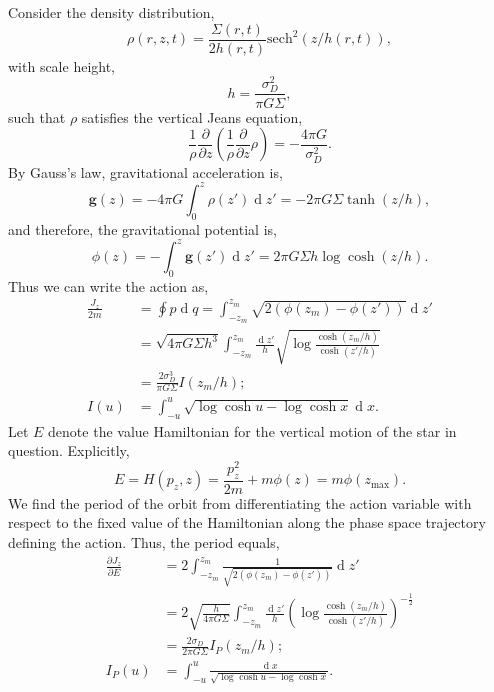 \documentclass[usenatbib]{mnras}
\renewcommand{\d}[1]{\! \mathrm{d}#1 \:}
\newcommand{\pderiv}[2]{\frac{\partial{#1}}{\partial{#2}}}
\newcommand{\sech}{\mathrm{sech}}
\renewcommand{\d}[1]{\ensuremath{\operatorname{d}\!{#1}}}
\begin{document}
Consider the density distribution,
\begin{equation} 
\rho(r, z, t) = \frac{\Sigma(r,t)}{2 h(r, t)} \sech^2{(z/h(r,t))}, 
\end{equation}
with scale height,
\begin{equation}
h = \frac{\sigma_D^2}{\pi G \Sigma},
\end{equation}
such that $\rho$ satisfies the vertical Jeans equation,
\begin{equation}
\frac{1}{\rho} \pderiv{}{z} \left( \frac{1}{\rho} \pderiv{}{z} \rho \right) = - \frac{4 \pi G}{\sigma_D^2}.
\end{equation}
By Gauss's law,  gravitational acceleration is,
\begin{equation}
\mathbf{g}(z) = -4 \pi G \int_0^z \rho(z') \d{z'} = -2 \pi G \Sigma \tanh{(z / h)}, 
\end{equation}
and therefore, the gravitational potential is,
\begin{equation}
\phi(z) = - \int_0^z \mathbf{g}(z') \d{z'} = 2 \pi G \Sigma h \log{\cosh{(z / h)}}.
\end{equation}
Thus we can write the action as,
\begin{subequations}
\begin{align}
\frac{J_z}{2m} & = \oint p \d{q} = \int_{-z_m}^{z_m} \sqrt{2(\phi(z_m) - \phi(z'))} \d{z'} 
\\
& = \sqrt{4 \pi G \Sigma h^3} \int_{-z_m}^{z_m} \frac{\d{z'}}{h}  \sqrt{\log{\frac{\cosh{(z_m / h)}}{\cosh{(z'/ h)}}}}
\\
& = \frac{2 \sigma_D^3}{\pi G \Sigma} I(z_m / h);
\\
I(u) & = \int_{-u}^u \sqrt{\log{\cosh{u}} - \log{\cosh{x}}} \d{x}.
\end{align}
\end{subequations}
Let $E$ denote the value Hamiltonian for the vertical motion of the star in question. Explicitly, 
\begin{equation}
E = H(p_z, z) = \frac{p_z^2}{2 m} + m \phi(z) = m \phi(z_{\text{max}}).  
\end{equation}
We find the period of the orbit from differentiating the action variable with respect to the fixed value of the Hamiltonian along the phase space trajectory defining the action. Thus, the period equals,
\begin{align}
\pderiv{J_z}{E} & = 2 \int_{-z_m}^{z_m} \frac{1}{\sqrt{2 ( \phi(z_m) - \phi(z') )}} \d{z'} 
\\
& = 2 \sqrt{\frac{h}{4 \pi G \Sigma }} \int_{-z_m}^{z_m}  \frac{\d{z'}}{h} \left( \log{\frac{\cosh{(z_m / h)}}{\cosh{(z'/ h)}}} \right)^{-\frac{1}{2}}
\\
& = \frac{2 \sigma_D}{2 \pi G \Sigma} I_P(z_m / h);
\\
I_P(u) & = \int_{-u}^u \frac{\d{x}}{\sqrt{\log{\cosh{u}} - \log{\cosh{x}}}}.
\end{align}
\end{document}
